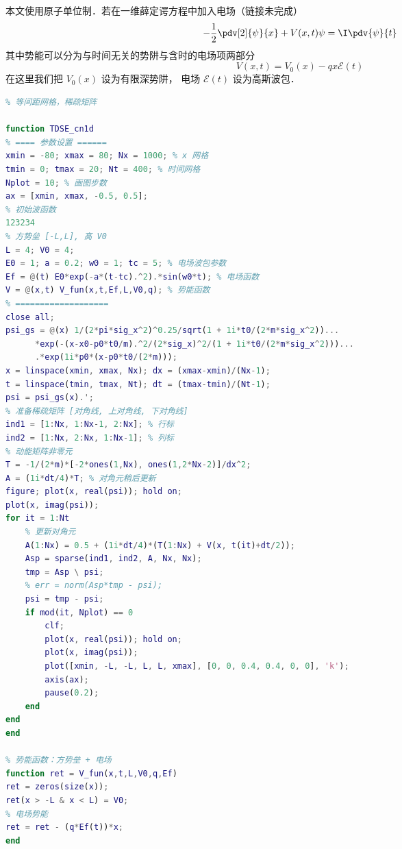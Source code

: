
\begin{issues}
\issueDraft
\end{issues}


本文使用原子单位制．若在一维薛定谔方程中加入电场（链接未完成）
\begin{equation}
-\frac12 \pdv[2]{\psi}{x} + V(x,t)\psi = \I \pdv{\psi}{t}
\end{equation}
其中势能可以分为与时间无关的势阱与含时的电场项两部分
\begin{equation}
V(x,t) = V_0(x) - qx\mathcal E(t)
\end{equation}
在这里我们把 $V_0(x)$ 设为有限深势阱， 电场 $\mathcal E(t)$ 设为高斯波包．

\begin{lstlisting}[language=matlab]
% Crank-Nicolson 法解一维薛定谔方程
% 等间距网格，稀疏矩阵

function TDSE_cn1d
% ==== 参数设置 ======
xmin = -80; xmax = 80; Nx = 1000; % x 网格
tmin = 0; tmax = 20; Nt = 400; % 时间网格
Nplot = 10; % 画图步数
ax = [xmin, xmax, -0.5, 0.5];
% 初始波函数
123234
% 方势垒 [-L,L], 高 V0
L = 4; V0 = 4;
E0 = 1; a = 0.2; w0 = 1; tc = 5; % 电场波包参数
Ef = @(t) E0*exp(-a*(t-tc).^2).*sin(w0*t); % 电场函数
V = @(x,t) V_fun(x,t,Ef,L,V0,q); % 势能函数
% ===================
close all;
psi_gs = @(x) 1/(2*pi*sig_x^2)^0.25/sqrt(1 + 1i*t0/(2*m*sig_x^2))...
      *exp(-(x-x0-p0*t0/m).^2/(2*sig_x)^2/(1 + 1i*t0/(2*m*sig_x^2)))...
      .*exp(1i*p0*(x-p0*t0/(2*m)));
x = linspace(xmin, xmax, Nx); dx = (xmax-xmin)/(Nx-1);
t = linspace(tmin, tmax, Nt); dt = (tmax-tmin)/(Nt-1);
psi = psi_gs(x).';
% 准备稀疏矩阵 [对角线, 上对角线, 下对角线]
ind1 = [1:Nx, 1:Nx-1, 2:Nx]; % 行标
ind2 = [1:Nx, 2:Nx, 1:Nx-1]; % 列标
% 动能矩阵非零元
T = -1/(2*m)*[-2*ones(1,Nx), ones(1,2*Nx-2)]/dx^2;
A = (1i*dt/4)*T; % 对角元稍后更新
figure; plot(x, real(psi)); hold on;
plot(x, imag(psi));
for it = 1:Nt
    % 更新对角元
    A(1:Nx) = 0.5 + (1i*dt/4)*(T(1:Nx) + V(x, t(it)+dt/2));
    Asp = sparse(ind1, ind2, A, Nx, Nx);
    tmp = Asp \ psi;
    % err = norm(Asp*tmp - psi);
    psi = tmp - psi;
    if mod(it, Nplot) == 0
        clf;
        plot(x, real(psi)); hold on;
        plot(x, imag(psi));
        plot([xmin, -L, -L, L, L, xmax], [0, 0, 0.4, 0.4, 0, 0], 'k');
        axis(ax);
        pause(0.2);
    end
end
end

% 势能函数：方势垒 + 电场
function ret = V_fun(x,t,L,V0,q,Ef)
ret = zeros(size(x));
ret(x > -L & x < L) = V0;
% 电场势能
ret = ret - (q*Ef(t))*x;
end
\end{lstlisting}
